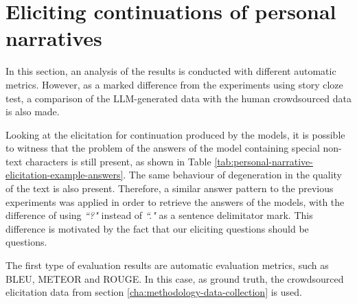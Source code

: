 \section{Eliciting continuations of personal narratives}
\label{cha:methodology-personal-narrative-elicitation-results}
In this section, an analysis of the results is conducted with different automatic metrics. However, as a marked difference from the experiments using story cloze test, a comparison of the LLM-generated data with the human crowdsourced data is also made.


Looking at the elicitation for continuation produced by the models, it is possible to witness that the problem of the answers of the model containing special non-text characters is still present, as shown in Table \ref{tab:personal-narrative-elicitation-example-answers}. The same behaviour of degeneration in the quality of the text is also present. Therefore, a similar answer pattern to the previous experiments was applied in order to retrieve the answers of the models, with the difference of using \emph{``?"} instead of \emph{``."} as a sentence delimitator mark. This difference is motivated by the fact that our eliciting questions should be questions.
% 


% 
The first type of evaluation results are automatic evaluation metrics, such as BLEU, METEOR and ROUGE. In this case, as ground truth, the crowdsourced elicitation data from section \ref{cha:methodology-data-collection} is used.


